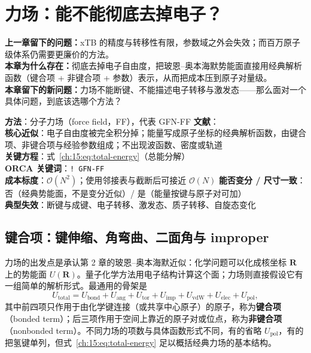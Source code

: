 
\section{力场：能不能彻底去掉电子？}
\label{ch:15:sec:title}

\begin{problemchain}
\textbf{上一章留下的问题：}xTB 的精度与转移性有限，参数域之外会失效；而百万原子级体系仍需要更廉价的方法。\\
\textbf{本章为什么存在：}彻底去掉电子自由度，把玻恩--奥本海默势能面直接用经典解析函数（键合项 + 非键合项 + 参数）表示，从而把成本压到原子对量级。\\
\textbf{本章留下的新问题：}力场不能断键、不能描述电子转移与激发态——那么面对一个具体问题，到底该选哪个方法？
\end{problemchain}

\begin{methodcard}
\textbf{方法}：分子力场（force field，FF），代表 GFN-FF\quad
\textbf{文献}：\citep{spicher2020gfnff,rappe1992uff,cornell1995amber,mackerell1998charmm,jorgensen1996oplsaa}\\
\textbf{核心近似}：电子自由度被完全积分掉；能量写成原子坐标的经典解析函数，由键合项、非键合项与经验参数组成；不出现波函数、密度或轨道\\
\textbf{关键方程}：式~\eqref{ch:15:eq:total-energy}（总能分解）\\
\textbf{ORCA 关键词}：\texttt{! GFN-FF}\\
\textbf{成本标度}：$\mathcal{O}(N^2)$；使用邻接表与截断后可接近 $\mathcal{O}(N)$\quad
\textbf{能否变分 / 尺寸一致}：否（经典势能面，不是变分近似）/ 是（能量按键与原子对可加）\\
\textbf{典型失效}：断键与成键、电子转移、激发态、质子转移、自旋态变化
\end{methodcard}

\subsection{键合项：键伸缩、角弯曲、二面角与 improper}
\label{ch:15:sec:bonded}

力场的出发点是承认第 2 章的玻恩--奥本海默近似：化学问题可以化成核坐标 $\mathbf{R}$ 上的势能面 $U(\mathbf{R})$。量子化学方法用电子结构计算这个面；力场则直接假设它有一组简单的解析形式。最通用的骨架是
\begin{equation}
U_{\mathrm{total}}
= U_{\mathrm{bond}} + U_{\mathrm{ang}} + U_{\mathrm{tor}} + U_{\mathrm{imp}}
+ U_{\mathrm{vdW}} + U_{\mathrm{elec}} + U_{\mathrm{pol}},
\label{ch:15:eq:total-energy}
\end{equation}
其中前四项只作用于由化学键连接（或共享中心原子）的原子，称为\textbf{键合项}（bonded term）；后三项作用于空间上靠近的原子对或位点，称为\textbf{非键合项}（nonbonded term）。不同力场的项数与具体函数形式不同，有的省略 $U_{\mathrm{pol}}$，有的把氢键单列，但式~\eqref{ch:15:eq:total-energy} 足以概括经典力场的基本结构。


